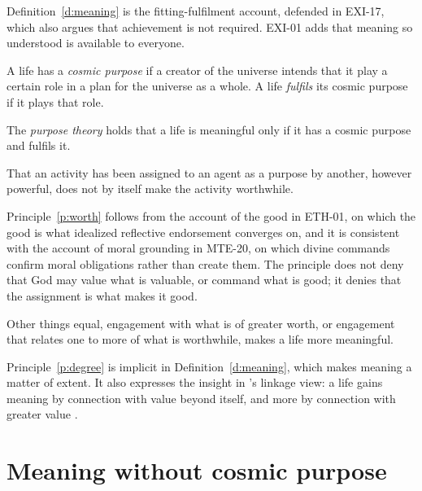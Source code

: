 \documentclass{situationist-preprint}
\begin{document}
Definition~\ref{d:meaning} is the fitting-fulfilment account, defended in EXI-17, which also argues that achievement is not required. EXI-01 adds that meaning so understood is available to everyone.

\begin{definition}\label{d:purpose}
A life has a \emph{cosmic purpose} if a creator of the universe intends that it play a certain role in a plan for the universe as a whole. A life \emph{fulfils} its cosmic purpose if it plays that role.
\end{definition}

\begin{definition}\label{d:pt}
The \emph{purpose theory} holds that a life is meaningful only if it has a cosmic purpose and fulfils it.
\end{definition}

\begin{principle}\label{p:worth}
That an activity has been assigned to an agent as a purpose by another, however powerful, does not by itself make the activity worthwhile.
\end{principle}

Principle~\ref{p:worth} follows from the account of the good in ETH-01, on which the good is what idealized reflective endorsement converges on, and it is consistent with the account of moral grounding in MTE-20, on which divine commands confirm moral obligations rather than create them. The principle does not deny that God may value what is valuable, or command what is good; it denies that the assignment is what makes it good.

\begin{principle}[Degree]\label{p:degree}
Other things equal, engagement with what is of greater worth, or engagement that relates one to more of what is worthwhile, makes a life more meaningful.
\end{principle}

Principle~\ref{p:degree} is implicit in Definition~\ref{d:meaning}, which makes meaning a matter of extent. It also expresses the insight in \citeauthor{Nozick1981}'s linkage view: a life gains meaning by connection with value beyond itself, and more by connection with greater value \citep[ch.~6]{Nozick1981}.

\section{Meaning without cosmic purpose}
\end{document}
